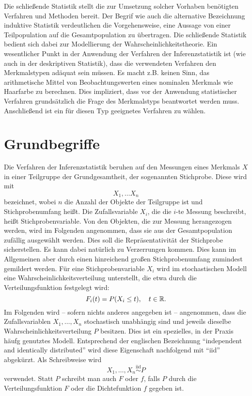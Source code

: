 \documentclass{lecture}
\begin{document}
    Die schließende Statistik stellt die zur Umsetzung solcher Vorhaben benötigten Verfahren und Methoden bereit.
    Der Begrif wie auch die alternative Bezeichnung induktive Statistik verdeutlichen die Vorgehensweise, eine Aussage von einer Teilpopulation auf die Gesamtpopulation zu übertragen.
    Die schließende Statistik bedient sich dabei zur Modellierung der Wahrscheinlichkeitstheorie.
    Ein wesentlicher Punkt in der Anwendung der Verfahren der Inferenzstatistik ist (wie auch in der deskriptiven Statistik), dass die verwendeten Verfahren den Merkmalstypen adäquat sein müssen.
    Es macht z.B. keinen Sinn, das arithmetische Mittel von Beobachtungswerten eines nominalen Merkmals wie Haarfarbe zu berechnen.
    Dies impliziert, dass vor der Anwendung statistischer Verfahren grundsätzlich die Frage des Merkmalstyps beantwortet werden muss.
    Anschließend ist ein für diesen Typ geeignetes Verfahren zu wählen.


    \section*{Grundbegriffe}

    Die Verfahren der Inferenzstatistik beruhen auf den Messungen eines Merkmals \(X\) in einer Teilgruppe der Grundgesamtheit, der sogenannten Stichprobe.
    Diese wird mit
    \[
        X_1, \ldots X_n
    \]
    bezeichnet, wobei \(n\) die Anzahl der Objekte der Teilgruppe ist und Stichprobenumfang heißt.
    Die Zufallsvariable \(X_i\), die die \(i\)-te Messung beschreibt, heißt Stichprobenvariable.
    Von den Objekten, die zur Messung herangezogen werden, wird im Folgenden angenommen, dass sie aus der Gesamtpopulation zufällig ausgewählt werden.
    Dies soll die Repräsentativität der Stichprobe sicherstellen.
    Es kann dabei natürlich zu Verzerrungen kommen.
    Dies kann im Allgemeinen aber durch einen hinreichend großen Stichprobenumfang zumindest gemildert werden.
    Für eine Stichprobenvariable \(X_i\) wird im stochastischen Modell eine Wahrscheinlichkeitsverteilung unterstellt, die etwa durch die Verteilungsfunktion festgelegt wird:
    \[
        F_i\parentheses*{t} = P\parentheses*{X_i \le t}, \quad t \in \R.
    \]
    Im Folgenden wird -- sofern nichts anderes angegeben ist -- angenommen, dass die Zufallsvariablen \(X_1, \ldots, X_n\) stochastisch unabhängig sind und jeweils dieselbe Wahrscheinlichkeitsverteilung \(P\) besitzen.
    Dies ist ein spezielles, in der Praxis häufg genutztes Modell.
    Entsprechend der englischen Bezeichnung ``independent and identically distributed'' wird diese Eigenschaft nachfolgend mit ``iid'' abgekürzt.
    Als Schreibweise wird
    \[
        X_1, \ldots, X_n \stackrel{\text{iid}}{\sim} P
    \]
    verwendet.
    Statt \(P\) schreibt man auch \(F\) oder \(f\), falls \(P\) durch die Verteilungsfunktion \(F\) oder die Dichtefunktion \(f\) gegeben ist.
\end{document}
